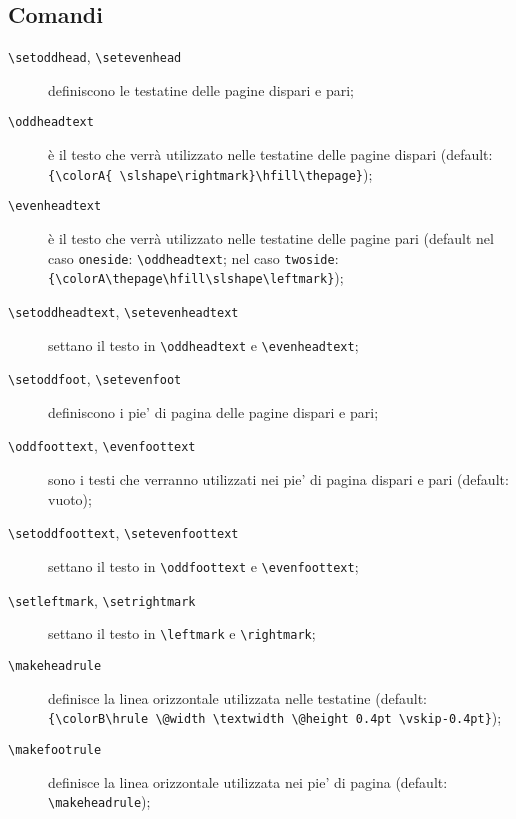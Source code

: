 \documentclass[a4paper,oneside,centered,noparindent,noparskip]{bookest}
\begin{document}
\subsection{Comandi}
\begin{description}
 \item[\texttt{\textbackslash setoddhead}, \texttt{\textbackslash setevenhead}] definiscono le testatine delle pagine dispari e pari;
 \item[\texttt{\textbackslash oddheadtext}] è il testo che verrà utilizzato nelle testatine delle pagine dispari (default: \texttt{\{\textbackslash colorA\{ \textbackslash slshape\textbackslash rightmark\}\textbackslash hfill\textbackslash thepage\}});
 \item[\texttt{\textbackslash evenheadtext}] è il testo che verrà utilizzato nelle testatine delle pagine pari (default nel caso \texttt{oneside}: \texttt{\textbackslash oddheadtext}; nel caso \texttt{twoside}: \texttt{\{\textbackslash colorA\textbackslash thepage\textbackslash hfill\textbackslash slshape\textbackslash leftmark\}});
 \item[\texttt{\textbackslash setoddheadtext}, \texttt{\textbackslash setevenheadtext}] settano il testo in \texttt{\textbackslash oddheadtext} e \texttt{\textbackslash evenheadtext};
 \item[\texttt{\textbackslash setoddfoot}, \texttt{\textbackslash setevenfoot}] definiscono i pie' di pagina delle pagine dispari e pari;
 \item[\texttt{\textbackslash oddfoottext}, \texttt{\textbackslash evenfoottext}] sono i testi che verranno utilizzati nei pie' di pagina dispari e pari (default: vuoto);
 \item[\texttt{\textbackslash setoddfoottext}, \texttt{\textbackslash setevenfoottext}] settano il testo in \texttt{\textbackslash oddfoottext} e \texttt{\textbackslash evenfoottext};
 \item[\texttt{\textbackslash setleftmark}, \texttt{\textbackslash setrightmark}] settano il testo in \texttt{\textbackslash leftmark} e \texttt{\textbackslash rightmark};
 \item[\texttt{\textbackslash makeheadrule}] definisce la linea orizzontale utilizzata nelle testatine (default: \texttt{\{\textbackslash colorB\textbackslash hrule \textbackslash @width \textbackslash textwidth \textbackslash @height 0.4pt \textbackslash vskip-0.4pt\}});
 \item[\texttt{\textbackslash makefootrule}] definisce la linea orizzontale utilizzata nei pie' di pagina (default: \texttt{\textbackslash makeheadrule});
\end{description}
\end{document}
